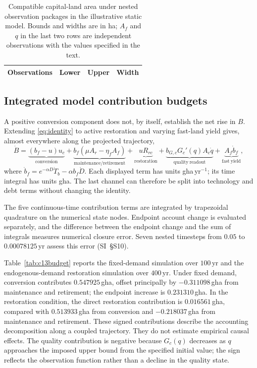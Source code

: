 \documentclass[preprint,12pt,authoryear]{elsarticle}
\begin{document}
\begin{table}[htbp]
\centering\small
\caption{Compatible capital-land area under nested observation packages in the illustrative static model. Bounds and widths are in ha; $A_f$ and $q$ in the last two rows are independent observations with the values specified in the text.}
\label{tab:c13bounds}
\begin{tabular}{lrrr}
\toprule
Observations & Lower & Upper & Width \\
\midrule

\end{tabular}
\end{table}

\subsection{Integrated model contribution budgets}\label{sec:c13budget}

A positive conversion component does not, by itself, establish the net rise in $B$. Extending \eqref{eq:identity} to active restoration and varying fast-land yield gives, almost everywhere along the projected trajectory,
\begin{equation}\label{eq:c13fullbudget}
\dot B=\underbrace{(b_f-u)u_c}_{\mathrm{conversion}}+
\underbrace{b_f(\mu A_r-\eta_fA_f)}_{\mathrm{maintenance/retirement}}+
\underbrace{uR_{rc}}_{\mathrm{restoration}}+
\underbrace{b_{G,c}G_c'(q)A_c\dot q}_{\mathrm{quality\ readout}}+
\underbrace{A_f\dot b_f}_{\mathrm{fast\ yield}},
\end{equation}
where $\dot b_f=e^{-\alpha D}\dot T_b-\alpha b_f\dot D$. Each displayed term has units gha\,yr$^{-1}$; its time integral has units gha. The last channel can therefore be split into technology and debt terms without changing the identity.

The five continuous-time contribution terms are integrated by trapezoidal quadrature on the numerical state nodes. Endpoint account change is evaluated separately, and the difference between the endpoint change and the sum of integrals measures numerical closure error. Seven nested timesteps from $0.05$ to $0.00078125$\,yr assess this error (SI~\S S10).

Table~\ref{tab:c13budget} reports the fixed-demand simulation over $100$\,yr and the endogenous-demand restoration simulation over $400$\,yr. Under fixed demand, conversion contributes $0.547925$\,gha, offset principally by $-0.311098$\,gha from maintenance and retirement; the endpoint increase is $0.231310$\,gha. In the restoration condition, the direct restoration contribution is $0.016561$\,gha, compared with $0.513933$\,gha from conversion and $-0.218037$\,gha from maintenance and retirement. These signed contributions describe the accounting decomposition along a coupled trajectory. They do not estimate empirical causal effects. The quality contribution is negative because $G_c(q)$ decreases as $q$ approaches the imposed upper bound from the specified initial value; the sign reflects the observation function rather than a decline in the quality state.
\end{document}
